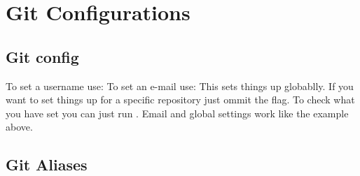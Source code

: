 \chapter{Git Configurations}
\chapteroverlay

\section{Git config}
To set a username use: 
\newline\noindent To set an e-mail use: 
\newline\noindent This sets things up globablly. If you want to set things up for a specific repository just ommit the  flag.
\newline\noindent To check what you have set you can just run . Email and global settings work like the example above.


\section{Git Aliases}